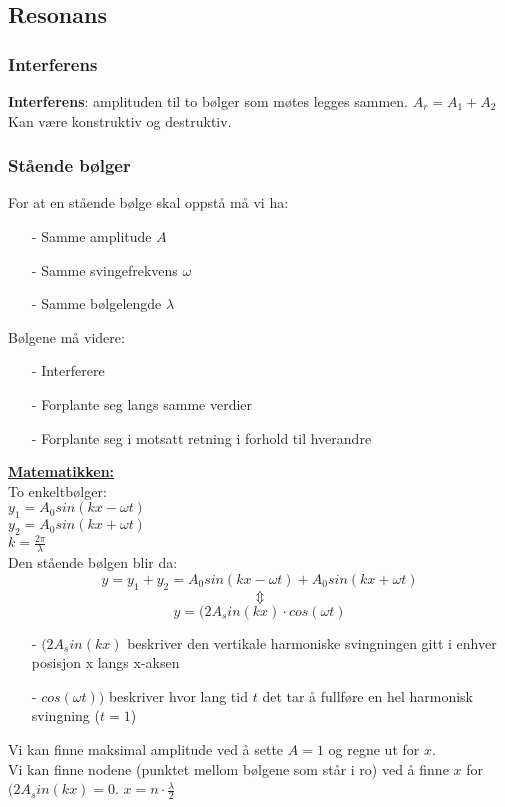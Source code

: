 \documentclass[12pt]{article}
\begin{document}
\subsection{Resonans}
\subsubsection{Interferens}
\textbf{Interferens}: amplituden til to bølger som møtes legges sammen. $A_r = A_1+ A_2$\\
Kan være konstruktiv og destruktiv.\\

\subsubsection{Stående bølger}
For at en stående bølge skal oppstå må vi ha:
\begin{itemize}
    \item[-] Samme amplitude $A$
    \item[-] Samme svingefrekvens $\omega$
    \item[-] Samme bølgelengde $\lambda$
\end{itemize}
Bølgene må videre:
\begin{itemize}
    \item[-] Interferere
    \item[-] Forplante seg langs samme verdier
    \item[-] Forplante seg i motsatt retning i forhold til hverandre
\end{itemize}
\textbf{\underline{Matematikken:}}\\
\bigskip
To enkeltbølger:\\
$y_1 = A_0sin(kx-\omega t)$\\
$y_2 = A_0 sin(kx+\omega t)$\\
$k = \frac{2\pi}{\lambda}$\\
\bigskip
Den stående bølgen blir da:
$$y = y_1+y_2 = A_0sin(kx-\omega t) +  A_0 sin(kx+\omega t)$$
$$\Updownarrow$$
$$y = (2A_sin(kx)\cdot cos(\omega t)$$
\begin{itemize}
    \item [-] $(2A_sin(kx)$ beskriver den vertikale harmoniske svingningen gitt i enhver posisjon x langs x-aksen
    \item [-] $cos(\omega t))$ beskriver hvor lang tid $t$ det tar å fullføre en hel harmonisk svingning ($t=1$)
\end{itemize}

Vi kan finne maksimal amplitude ved å sette $A = 1$ og regne ut for $x$.\\
Vi kan finne nodene (punktet mellom bølgene som står i ro) ved å finne $x$ for $(2A_sin(kx) = 0$. $x = n\cdot \frac{\lambda}{2}$
\end{document}
